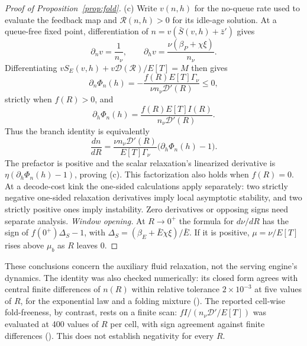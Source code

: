 \begin{proof}[Proof of Proposition~\ref{prop:fold}]
(c) Write $v(n,h)$ for the no-queue rate used to evaluate the feedback map and $\mathcal R(n,h)>0$ for its idle-age solution. At a queue-free fixed point, differentiation of $n=v(\bar S(v,h)+\bar z')$ gives
\[
\partial_n v=\frac1{n_\nu},\qquad
\partial_h v=\frac{\nu(\beta_P+\chi\xi)}{n_\nu}.
\]
Differentiating $vS_E(v,h)+v\mathcal D(\mathcal R)/E[T]=M$ then gives
\[
\partial_n\Phi_n(h)
=-\frac{f(R)E[T]\Gamma_\nu}{\nu n_\nu\mathcal D'(R)}
\le0,
\]
strictly when $f(R)>0$, and
\[
\partial_h\Phi_n(h)=\frac{f(R)E[T]I(R)}{n_\nu\mathcal D'(R)}.
\]
Thus the branch identity is equivalently
\[
\frac{dn}{dR}
=\frac{\nu n_\nu\mathcal D'(R)}{E[T]\Gamma_\nu}
\bigl(\partial_h\Phi_n(h)-1\bigr).
\]
The prefactor is positive and the scalar relaxation's linearized derivative is $\eta(\partial_h\Phi_n(h)-1)$, proving (c). This factorization also holds when $f(R)=0$. At a decode-cost kink the one-sided calculations apply separately: two strictly negative one-sided relaxation derivatives imply local asymptotic stability, and two strictly positive ones imply instability. Zero derivatives or opposing signs need separate analysis.
\emph{Window opening.} At $R\to0^+$ the formula for $d\nu/dR$ has the sign of $f(0^+)\Delta_S-1$, with $\Delta_S=(\beta_E+\bar E\chi\xi)/\bar E$. If it is positive, $\mu=\nu/E[T]$ rises above $\mu_b$ as $R$ leaves 0.
\end{proof}
\noindent These conclusions concern the auxiliary fluid relaxation, not the serving engine's dynamics. The identity was also checked numerically: its closed form agrees with central finite differences of $n(R)$ within relative tolerance $2\times10^{-3}$ at five values of $R$, for the exponential law and a folding mixture (). The reported cell-wise fold-freeness, by contrast, rests on a finite scan: $fI/(n_\nu\mathcal D'/E[T])$ was evaluated at 400 values of $R$ per cell, with sign agreement against finite differences (). This does not establish negativity for every $R$.

